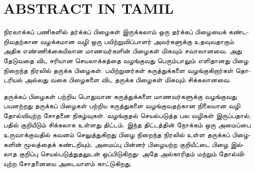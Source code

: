 \chapter*{\uppercase{ABSTRACT IN TAMIL}}
\begin{otherlanguage}{tamil}\justifying
நிரலாக்கப் பணிகளில் தர்க்கப் பிழைகள் இருக்கலாம்
ஒரு தர்க்கப் பிழையைக் கண்டறிவதற்கான வழக்கமான வழி ஒரு பயிற்றுவிப்பாளர் அவர்களுக்கு உதவுவதாகும்
அதிக எண்ணிக்கையிலான மாணவர்களின் பிழைகள் மிகவும் சவாலானவை. அது
தேடுவதை விட சரியான செயலாக்கத்தை வழங்குவது பெரும்பாலும் எளிதானது
பிழை நிறைந்த நிரலில் தருக்க பிழைகள். பயிற்றுனர்கள் கருத்துக்களை வழங்குகிறார்கள்
தொடரியல் அல்லது வகை பிழைகளை விட தருக்க பிழைகள் மிகவும் சிக்கலானவை.
\par தருக்கப் பிழைகள் பற்றிய பொதுவான கருத்துக்களை மாணவர்களுக்கு வழங்குவது பயனற்றது
தருக்கப் பிழைகள் பற்றிய கருத்துகளை வழங்குவதற்கான நிலையான வழி தோல்வியுற்ற சோதனை நிகழ்வுகள். வழங்குதல்
செயல்படுத்த பல வழிகள் இருப்பதால், பதில் குறியீடும் சிக்கலாக உள்ளது
திட்டம். இந்த திட்டத்தின் நோக்கம் ஒரு அமைப்பை உருவாக்குவதில் கவனம் செலுத்துகிறது
பிழை நிறைந்த நிரலில் உள்ள தருக்கப் பிழைகளின் மூலத்தைக் கண்டறியும். அமைப்பு
பின்னர் பிழையற்ற குறியீட்டை பிழை இல்லாத குறிப்பு செயல்படுத்துதலுடன் ஒப்பிடுகிறது-
அதே அல்காரிதம் மற்றும் தோல்வியுற்ற சோதனையை அடையாளம் காட்டுகிறது.
\end{otherlanguage}